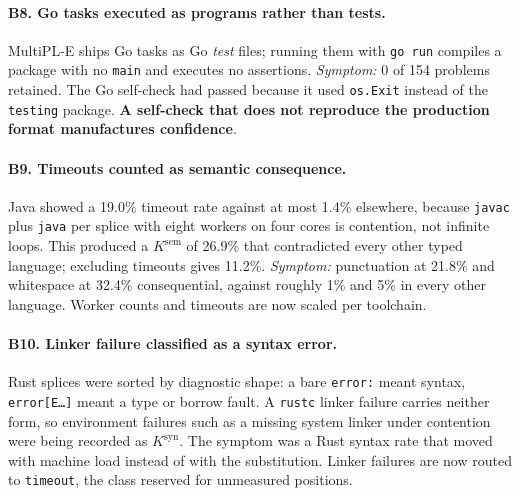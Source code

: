 \paragraph{B8. Go tasks executed as programs rather than tests.} MultiPL-E ships Go tasks as Go
\emph{test} files; running them with \texttt{go run} compiles a package with no \texttt{main} and
executes no assertions. \emph{Symptom:} 0 of 154 problems retained. The Go self-check had passed
because it used \texttt{os.Exit} instead of the \texttt{testing} package. \textbf{A self-check that
does not reproduce the production format manufactures confidence}.

\paragraph{B9. Timeouts counted as semantic consequence.} Java showed a 19.0\% timeout rate against
at most 1.4\% elsewhere, because \texttt{javac} plus \texttt{java} per splice with eight workers on
four cores is contention, not infinite loops. This produced a $K^{\mathrm{sem}}$ of 26.9\% that
contradicted every other typed language; excluding timeouts gives 11.2\%. \emph{Symptom:}
punctuation at 21.8\% and whitespace at 32.4\% consequential, against roughly 1\% and 5\% in every
other language. Worker counts and timeouts are now scaled per toolchain.

\paragraph{B10. Linker failure classified as a syntax error.} Rust splices were sorted by
diagnostic shape: a bare \texttt{error:} meant syntax, \texttt{error[E\ldots]} meant a type or borrow
fault. A \texttt{rustc} linker failure carries neither form, so environment failures such as a
missing system linker under contention were being recorded as $K^{\mathrm{syn}}$. The symptom was a Rust
syntax rate that moved with machine load instead of with the substitution. Linker failures are now
routed to \texttt{timeout}, the class reserved for unmeasured positions.


